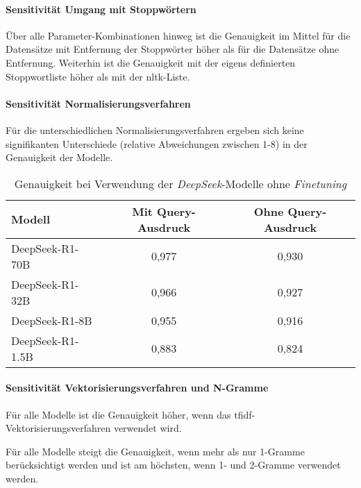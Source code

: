 \paragraph{Sensitivität Umgang mit Stoppwörtern}

Über alle Parameter-Kombinationen hinweg ist die Genauigkeit im Mittel für die Datensätze mit Entfernung der Stoppwörter höher als für die Datensätze ohne Entfernung.
Weiterhin ist die Genauigkeit mit der eigens definierten Stoppwortliste höher als mit der \gls{nltk}-Liste.

\paragraph{Sensitivität Normalisierungsverfahren}

Für die unterschiedlichen Normalisierungsverfahren ergeben sich keine signifikanten Unterschiede (relative Abweichungen zwischen 1-8\textperthousand) in der Genauigkeit der Modelle.

\begin{table}
    \center
    \begin{tabular}{lcc}
        \toprule
        Modell           & Mit Query-Ausdruck & Ohne Query-Ausdruck \\
        \midrule
        DeepSeek-R1-70B  & 0,977                           &  0,930                         \\
        DeepSeek-R1-32B  & 0,966                           &  0,927                         \\
        DeepSeek-R1-8B   & 0,955                           &  0,916                         \\
        DeepSeek-R1-1.5B & 0,883                           &  0,824                         \\
        \bottomrule
    \end{tabular}
    \caption{Genauigkeit bei Verwendung der \textit{DeepSeek}-Modelle ohne \textit{Finetuning}}
    \label{tab:deepseek-results}
\end{table}

\paragraph{Sensitivität Vektorisierungsverfahren und N-Gramme}

Für alle Modelle ist die Ge\-nauig\-keit höher, wenn das \gls{tfidf}-Vektorisierungsverfahren verwendet wird.

Für alle Modelle steigt die Genauigkeit, wenn mehr als nur 1-Gramme berücksichtigt werden und ist am höchsten, wenn 1- und 2-Gramme verwendet werden.

